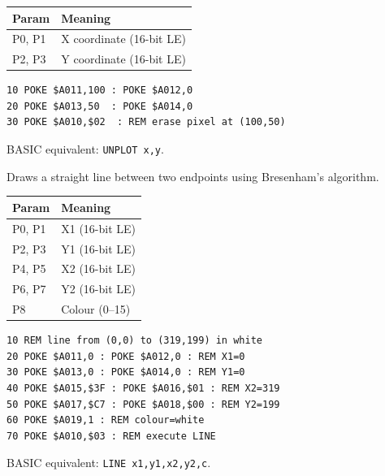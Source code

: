 \begin{center}
\small
\begin{tabular}{@{}ll@{}}
\toprule
\textbf{Param} & \textbf{Meaning} \\
\midrule
P0, P1 & X coordinate (16-bit LE) \\
P2, P3 & Y coordinate (16-bit LE) \\
\bottomrule
\end{tabular}
\end{center}

\begin{lstlisting}
10 POKE $A011,100 : POKE $A012,0
20 POKE $A013,50  : POKE $A014,0
30 POKE $A010,$02  : REM erase pixel at (100,50)
\end{lstlisting}

\begin{notebox}
BASIC equivalent: \texttt{UNPLOT x,y}.
\end{notebox}



Draws a straight line between two endpoints using Bresenham's algorithm.

\begin{center}
\small
\begin{tabular}{@{}ll@{}}
\toprule
\textbf{Param} & \textbf{Meaning} \\
\midrule
P0, P1 & X1 (16-bit LE) \\
P2, P3 & Y1 (16-bit LE) \\
P4, P5 & X2 (16-bit LE) \\
P6, P7 & Y2 (16-bit LE) \\
P8     & Colour (0--15) \\
\bottomrule
\end{tabular}
\end{center}

\begin{lstlisting}
10 REM line from (0,0) to (319,199) in white
20 POKE $A011,0 : POKE $A012,0 : REM X1=0
30 POKE $A013,0 : POKE $A014,0 : REM Y1=0
40 POKE $A015,$3F : POKE $A016,$01 : REM X2=319
50 POKE $A017,$C7 : POKE $A018,$00 : REM Y2=199
60 POKE $A019,1 : REM colour=white
70 POKE $A010,$03 : REM execute LINE
\end{lstlisting}

\begin{notebox}
BASIC equivalent: \texttt{LINE x1,y1,x2,y2,c}.
\end{notebox}

